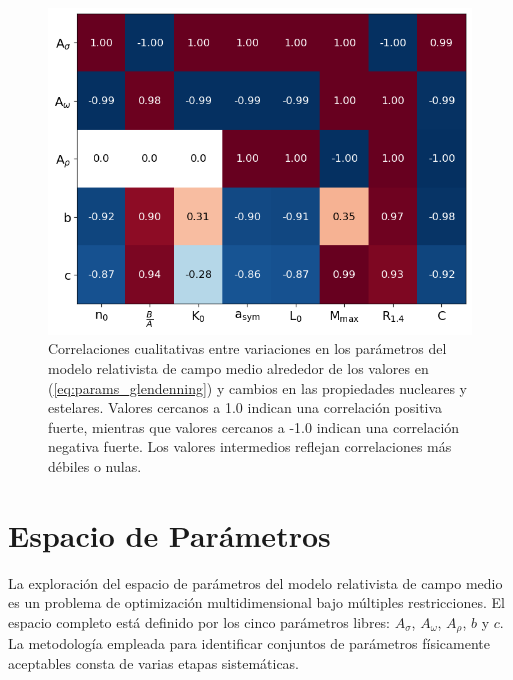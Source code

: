 \begin{figure}[h]
	\centering
	\includegraphics[width=0.7\linewidth]{Figuras/correlaciones_params}
	\caption[Correlaciones entre parámetros y observables]{Correlaciones cualitativas entre variaciones en los parámetros del modelo relativista de campo medio alrededor de los valores en (\ref{eq:params_glendenning}) y cambios en las propiedades nucleares y estelares. Valores cercanos a 1.0 indican una correlación positiva fuerte, mientras que valores cercanos a -1.0 indican una correlación negativa fuerte. Los valores intermedios reflejan correlaciones más débiles o nulas.}
	\label{fig:correlacionesparams}
\end{figure}


\section{Espacio de Parámetros}

La exploración del espacio de parámetros del modelo relativista de campo medio es un problema de optimización multidimensional bajo múltiples restricciones. El espacio completo está definido por los cinco parámetros libres: $A_\sigma$, $A_\omega$, $A_\rho$, $b$ y $c$. La metodología empleada para identificar conjuntos de parámetros físicamente aceptables consta de varias etapas sistemáticas.

